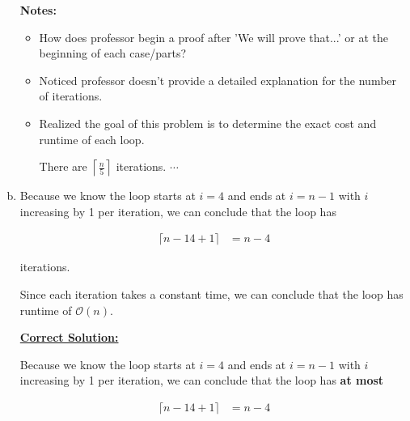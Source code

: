 \documentclass[12pt]{article}
\begin{document}
\begin{enumerate}[a.]
\begin{mdframed}
    \end{mdframed}

    \bigskip

    \textbf{Notes:}

    \begin{itemize}
        \item How does professor begin a proof after 'We will prove that...' or
        at the beginning of each case/parts?

        \item Noticed professor doesn't provide a detailed explanation for the
        number of iterations.

        \item Realized the goal of this problem is to determine the exact cost and runtime
        of each loop.

        \bigskip

        \begin{mdframed}
            There are $\left\lceil \frac{n}{5} \right\rceil$ iterations. $\cdots$
        \end{mdframed}

    \end{itemize}


    \item

    Because we know the loop starts at $i = 4$ and ends at $i = n - 1$ with $i$
    increasing by 1 per iteration, we can conclude that the loop has

    \setcounter{equation}{0}
    \begin{align}
        \lceil n - 1 4 + 1 \rceil &= n - 4
    \end{align}

    iterations.

    \bigskip

    Since each iteration takes a constant time, we can conclude that the loop has
    runtime of $\mathcal{O}(n)$.

    \bigskip

    \begin{mdframed}
        \underline{\textbf{Correct Solution:}}

        \bigskip

        Because we know the loop starts at $i = 4$ and ends at $i = n - 1$ with $i$
        increasing by 1 per iteration, we can conclude that the loop has
        \color{red}\textbf{at most}\color{black}

        \setcounter{equation}{0}
        \begin{align}
            \lceil n - 1 4 + 1 \rceil &= n - 4
        \end{align}


\end{mdframed}
\end{enumerate}
\end{document}
